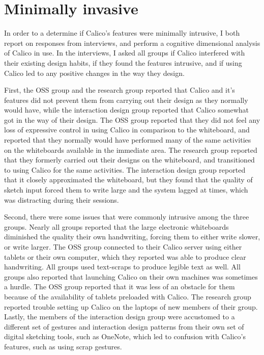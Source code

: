 \section{Minimally invasive}
\label{chapter:discussion:minimally-invasive}

In order to a determine if Calico's features were minimally intrusive, I both report on responses from interviews, and perform a cognitive dimensional analysis of Calico in use. In the interviews, I asked all groups if Calico interfered with their existing design habits, if they found the features intrusive, and if using Calico led to any positive changes in the way they design.

First, the OSS group and the research group reported that Calico and it's features did not prevent them from carrying out their design as they normally would have, while the interaction design group reported that Calico somewhat got in the way of their design. The OSS group reported that they did not feel any loss of expressive control in using Calico in comparison to the whiteboard, and reported that they normally would have performed many of the same activities on the whiteboards available in the immediate area. The research group reported that they formerly carried out their designs on the whiteboard, and transitioned to using Calico for the same activities. The interaction design group reported that it closely approximated the whiteboard, but they found that the quality of sketch input forced them to write large and the system lagged at times, which was distracting during their sessions.


Second, there were some issues that were commonly intrusive among the three groups. Nearly all groups reported that the large electronic whiteboards diminished the quality their own handwriting, forcing them to either write slower, or write larger. The OSS group connected to their Calico server using either tablets or their own computer, which they reported was able to produce clear handwriting. All groups used text-scraps to produce legible text as well. All groups also reported that launching Calico on their own machines was sometimes a hurdle. The OSS group reported that it was less of an obstacle for them because of the availability of tablets preloaded with Calico. The research group reported trouble setting up Calico on the laptops of new members of their group. Lastly, the members of the interaction design group were accustomed to a different set of gestures and interaction design patterns from their own set of digital sketching tools, such as OneNote, which led to confusion with Calico's features, such as using scrap gestures.


